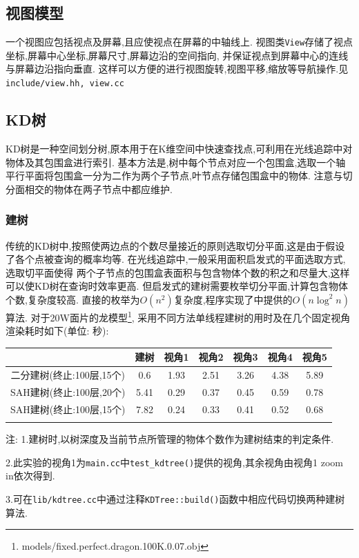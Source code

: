 \subsection{视图模型}
一个视图应包括视点及屏幕,且应使视点在屏幕的中轴线上.
视图类\verb|View|存储了视点坐标,屏幕中心坐标,屏幕尺寸,屏幕边沿的空间指向,
并保证视点到屏幕中心的连线与屏幕边沿指向垂直.
这样可以方便的进行视图旋转,视图平移,缩放等导航操作.见\verb|include/view.hh, view.cc|

\subsection{KD树}
KD树是一种空间划分树,原本用于在K维空间中快速查找点,可利用在光线追踪中对物体及其包围盒进行索引.
基本方法是,树中每个节点对应一个包围盒,选取一个轴平行平面将包围盒一分为二作为两个子节点,叶节点存储包围盒中的物体.
注意与切分面相交的物体在两子节点中都应维护.

\subsubsection{建树}
传统的KD树中,按照使两边点的个数尽量接近的原则选取切分平面,这是由于假设了各个点被查询的概率均等.
在光线追踪中,一般采用面积启发式的平面选取方式\cite{kdtree},选取切平面使得
两个子节点的包围盒表面积与包含物体个数的积之和尽量大,这样可以使KD树在查询时效率更高.
但启发式的建树需要枚举切分平面,计算包含物体个数,复杂度较高.
直接的枚举为$ O(n^2)$复杂度,程序实现了\cite{kdtree}中提供的$ O(n \log^2 n)$算法.
对于20W面片的龙模型\footnote{models/fixed.perfect.dragon.100K.0.07.obj},
采用不同方法单线程建树的用时及在几个固定视角渲染耗时如下(单位: 秒):

\begin{table}[H]
  \begin{threeparttable}

    \begin{tabular}{c|c|c|c|c|c|c}
      \shline
      & 建树 & 视角1 & 视角2 & 视角3 & 视角4 & 视角5 \\ \hline
      二分建树(终止:100层,15个)  & 0.6  & 1.93  & 2.51  & 3.26  & 4.38  & 5.89  \\ \hline
      SAH建树(终止:100层,20个) & 5.41 & 0.29  & 0.37  & 0.45  & 0.59  & 0.78    \\ \hline
      SAH建树(终止:100层,15个) & 7.82 & 0.24  & 0.33  & 0.41  & 0.52  & 0.68    \\ \shline
    \end{tabular}
    \begin{tablenotes}
      \footnotesize
    \item 注: 1.建树时,以树深度及当前节点所管理的物体个数作为建树结束的判定条件.
    \item 2.此实验的视角1为\verb|main.cc|中\verb|test_kdtree()|提供的视角,其余视角由视角1 zoom in依次得到.
    \item 3.可在\verb|lib/kdtree.cc|中通过注释\verb|KDTree::build()|函数中相应代码切换两种建树算法.
    \end{tablenotes}
  \end{threeparttable}
\end{table}

